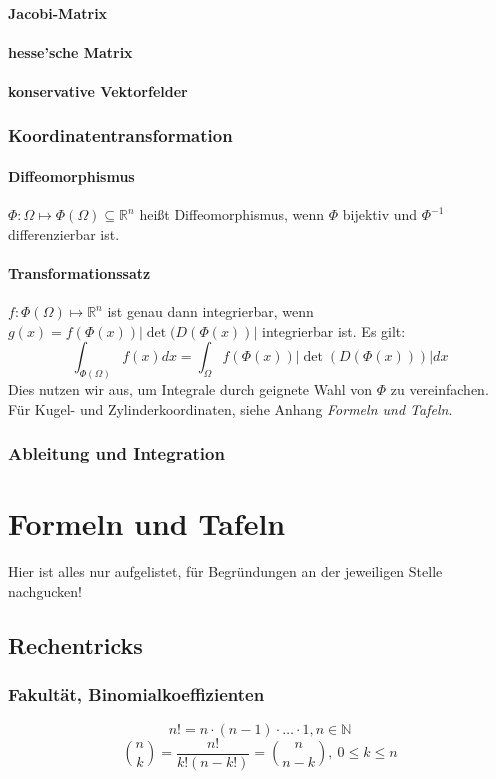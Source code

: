 \documentclass[a4paper, 9pt, DIV=24]{scrartcl}
\newcommand{\N}{\mathbb{N}}
\newcommand{\R}{\mathbb{R}}
\begin{document}
\paragraph{Jacobi-Matrix}


\paragraph{hesse'sche Matrix}

\paragraph{konservative Vektorfelder}

\subsubsection{Koordinatentransformation}
\paragraph{Diffeomorphismus}
$\Phi: \Omega \mapsto \Phi(\Omega) \subseteq \R^n$ heißt Diffeomorphismus, wenn $\Phi$ bijektiv und $\Phi^{-1}$ differenzierbar ist.

\paragraph{Transformationssatz}
$f: \Phi(\Omega) \mapsto \R^n$ ist genau dann integrierbar, wenn $g(x) = f(\Phi(x))|\det(D(\Phi(x))|$ integrierbar ist.
Es gilt:
\[ \int_{\Phi(\Omega)} f(x)dx = \int_{\Omega} f(\Phi(x))|\det(D(\Phi(x)))|dx\]
Dies nutzen wir aus, um Integrale durch geignete Wahl von $\Phi$ zu vereinfachen.
Für Kugel- und Zylinderkoordinaten, siehe Anhang \emph{Formeln und Tafeln}.

\subsubsection{Ableitung und Integration}

\clearpage
\section{Formeln und Tafeln}
Hier ist alles nur aufgelistet, für Begründungen an der jeweiligen Stelle nachgucken!
\subsection{Rechentricks}
\subsubsection{Fakultät, Binomialkoeffizienten}
\[ n! = n\cdot(n-1)\cdot\dots\cdot1, n\in\N \]
\[ \binom{n}{k} = \frac{n!}{k!(n-k!)} = \binom{n}{n-k},\ 0 \leq k \leq n \]
\end{document}
